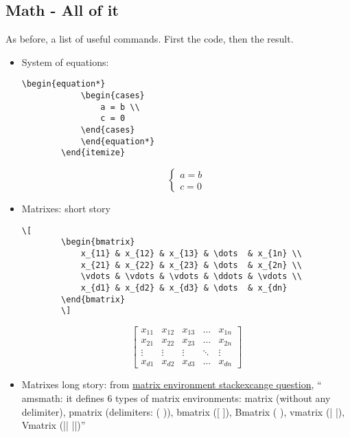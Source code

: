 



\subsection{Math - All of it}
\par As before, a list of useful commands. First the code, then the result.
\begin{itemize}
    \item System of equations:

    \begin{lstlisting}[language=Tex, numbers=none]
        \begin{equation*}
            \begin{cases}
                a = b \\
                c = 0
            \end{cases}
            \end{equation*}
        \end{itemize}        
    \end{lstlisting}
       
    \begin{equation*}
        \begin{cases}
            a = b \\
            c = 0
        \end{cases}
        \end{equation*}

    \item Matrixes: short story
    \begin{lstlisting}[language = Tex, numbers = none]
        \[
        \begin{bmatrix}
            x_{11} & x_{12} & x_{13} & \dots  & x_{1n} \\
            x_{21} & x_{22} & x_{23} & \dots  & x_{2n} \\
            \vdots & \vdots & \vdots & \ddots & \vdots \\
            x_{d1} & x_{d2} & x_{d3} & \dots  & x_{dn}
        \end{bmatrix}
        \]
    \end{lstlisting}

    \[
    \begin{bmatrix}
        x_{11} & x_{12} & x_{13} & \dots  & x_{1n} \\
        x_{21} & x_{22} & x_{23} & \dots  & x_{2n} \\
        \vdots & \vdots & \vdots & \ddots & \vdots \\
        x_{d1} & x_{d2} & x_{d3} & \dots  & x_{dn}
    \end{bmatrix}
    \]
    \item Matrixes long story: from \href{https://tex.stackexchange.com/questions/342385/matrix-operations-in-latex}{matrix environment stackexcange question}, `` amsmath: it defines 6 types of matrix environments: matrix (without any delimiter), pmatrix (delimiters: ( )), bmatrix ([ ]), Bmatrix ({ }), vmatrix (| |), Vmatrix (|| ||)''
    

\end{itemize}
